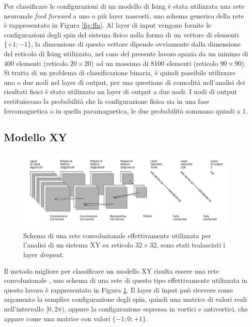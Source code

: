 \documentclass{article}
\begin{document}
Per classificare le configurazioni di un modello di Ising è stata utilizzata una rete neuronale \emph{feed forward} a uno o più layer nascosti, uno schema generico della rete è rappresentato in Figura \ref{fig:ffn}.
Al layer di input vengono fornite le configurazioni degli spin del sistema fisico nella forma di un vettore di elementi $\{+1;-1\}$, la dimensione di questo vettore dipende ovviamente dalla dimensione del reticolo di Ising utilizzato, nel caso del presente lavoro spazia da un minimo di 400 elementi (reticolo $20\times20$) ad un massimo di 8100 elementi (reticolo $90\times90$).
Si tratta di un problema di classificazione binaria, è quindi possibile utilizzare uno o due nodi nel layer di output, per una questione di comodità nell'analisi dei risultati fisici è stato utilizzato un layer di output a due nodi.
I nodi di output restituiscono la probabilità che la configurazione fisica sia in una fase ferromagnetica o in quella paramagnetica, le due probabilità sommano quindi a 1.

\subsection{Modello XY}

\begin{figure}[!ht]
 \centerline{\includegraphics[scale=0.35]{cnn.png}}
 \caption{Schema di una rete convoluzionale effettivamente utilizzata per l'analisi di un sistema XY su reticolo $32\times32$, sono stati tralasciati i layer \emph{dropout}.}
 \label{fig:cnn}
\end{figure}

Il metodo migliore per classificare un modello XY risulta essere una rete convoluzionale \cite{melko}, uno schema di una rete di questo tipo effettivamente utilizzata in questo lavoro è rappresentato in Figura \ref{fig:cnn}.
Il layer di input può ricevere come argomento la semplice configurazione degli spin, quindi una matrice di valori reali nell'intervallo $[0,2\pi)$, oppure la configurazione espressa in vortici e antivortici, che appare come una matrice con valori $\{-1;0;+1\}$.
\end{document}
